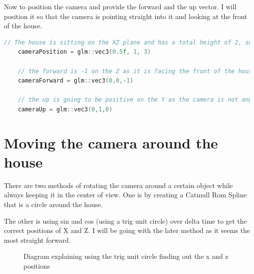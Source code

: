 \documentclass[10pt]{report}
\begin{document}
Now to position the camera and provide the forward and the up vector. I will position it so that the camera is pointing straight into it and looking at the front of the house.
\begin{lstlisting}[language = c]
    // The house is sitting on the XZ plane and has a total height of 2, so I placed the camera on the center with 1 on the Y axis. As the house goes from 0 to 1 on the X, I decided to place the camera in the center, this being 0.5. As the house already extrudes by 1 on the Z axis, I moved the camera back by 2 extra points to make sure that the house will fit into the FOV, making it 3 on the Z.
    cameraPosition = glm::vec3(0.5f, 1, 3) 

    // the forward is -1 on the Z as it is facing the front of the house that has a normal of (0,0,1)
    cameraForward = glm::vec3(0,0,-1) 

    // the up is going to be positive on the Y as the camera is not angled.
    cameraUp = glm::vec3(0,1,0) 
\end{lstlisting}

\section{Moving the camera around the house}
There are two methods of rotating the camera around a certain object while always keeping it in the center of view.
One is by creating a Catmull Rom Spline that is a circle around the house.

The other is using sin and cos (using a trig unit circle) over delta time to get the correct positions of X and Z. I will be going with the later method as it seems the most straight forward.

\begin{figure}[H]
    \centering
    \caption{Diagram explaining using the trig unit circle finding out the x and z positions}
\end{figure}
\end{document}

